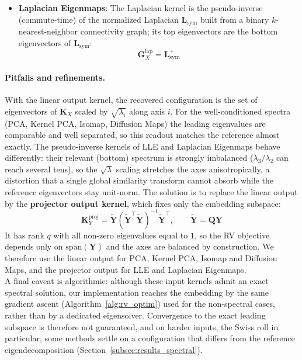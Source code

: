 \documentclass[11pt]{article}
\begin{document}
\begin{itemize}
		\item \textbf{Laplacian Eigenmaps}: The Laplacian kernel is the pseudo-inverse (commute-time) of the normalized Laplacian $\mathbf{L}_\text{sym}$ built from a binary $k$-nearest-neighbor connectivity graph; its top eigenvectors are the bottom eigenvectors of $\mathbf{L}_\text{sym}$:
		\begin{equation}
			\mathbf{G}^\text{lap}_X = \mathbf{L}_\text{sym}^{+}
		\end{equation}
		
	\end{itemize}
	
	\paragraph{Pitfalls and refinements.} With the linear output kernel, the recovered configuration is the set of eigenvectors of $\mathbf{K}_X$ scaled by $\sqrt{\lambda_i}$ along axis $i$. For the well-conditioned spectra (PCA, Kernel PCA, Isomap, Diffusion Maps) the leading eigenvalues are comparable and well separated, so this readout matches the reference almost exactly. The pseudo-inverse kernels of LLE and Laplacian Eigenmaps behave differently: their relevant (bottom) spectrum is strongly imbalanced ($\lambda_3/\lambda_2$ can reach several tens), so the $\sqrt{\lambda}$ scaling stretches the axes anisotropically, a distortion that a single global similarity transform cannot absorb while the reference eigenvectors stay unit-norm. The solution is to replace the linear output by the \textbf{projector output kernel}, which fixes only the embedding subspace:
	$$
	\mathbf{K}^\text{proj}_Y = \tilde{\mathbf{Y}}(\tilde{\mathbf{Y}}^\top\tilde{\mathbf{Y}})^{-1}\tilde{\mathbf{Y}}^\top,
	\qquad \tilde{\mathbf{Y}} = \mathbf{Q}\mathbf{Y}
	$$
	It has rank $q$ with all non-zero eigenvalues equal to $1$, so the RV objective depends only on $\mathrm{span}(\mathbf{Y})$ and the axes are balanced by construction. We therefore use the linear output for PCA, Kernel PCA, Isomap and Diffusion Maps, and the projector output for LLE and Laplacian Eigenmaps. \\
	
	A final caveat is algorithmic: although these input kernels admit an exact spectral solution, our implementation reaches the embedding by the same gradient ascent (Algorithm~\ref{alg:rv_optim}) used for the non-spectral cases, rather than by a dedicated eigensolver. Convergence to the exact leading subspace is therefore not guaranteed, and on harder inputs, the Swiss roll in particular, some methods settle on a configuration that differs from the reference eigendecomposition (Section~\ref{subsec:results_spectral}).
	
\end{document}
